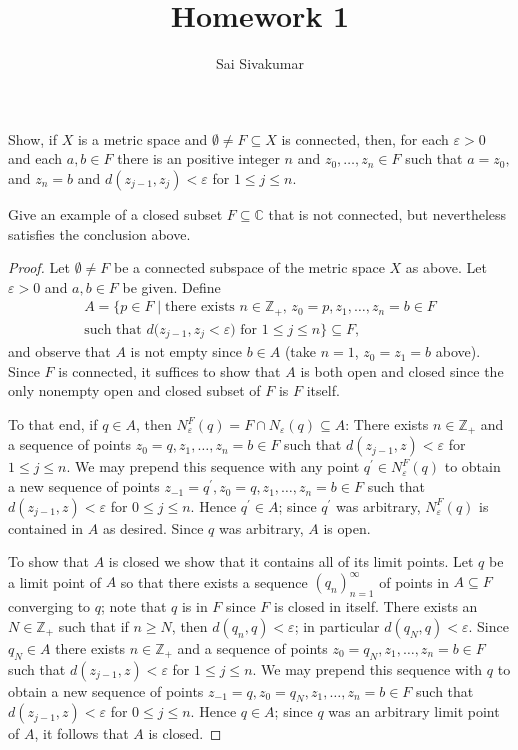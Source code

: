 \documentclass[12pt]{amsart}
\title{Homework 1}
\author{Sai Sivakumar}
\newcommand{\CC}{\mathbb{C}}
\begin{document}
\maketitle

\thispagestyle{empty}

Show, if $X$ is a metric space and $\emptyset \ne F \subseteq X$ is connected,
 then, for each $\varepsilon>0$ and each $a,b\in F$ there is an positive
 integer $n$ and $z_0,\dots,z_n\in F$ such that $a=z_0,$ and $z_n=b$ and
 $d(z_{j-1},z_j)<\varepsilon$ for $1\le j \le n.$ 

 Give an example of a closed subset $F\subseteq \CC$ that is not connected,
 but nevertheless satisfies the conclusion above.

\bigskip
\baselineskip=24pt
\begin{proof}
Let $\emptyset \neq F$ be a connected subspace of the metric space $X$ as above. Let $\varepsilon > 0$ and $a,b\in F$ be given. Define \begin{multline*}
    A = \{p\in F\mid \text{there exists $n\in \mathbb{Z}_+$, $z_0 = p, z_1,\dots,z_n = b\in F$}\\ \text{such that $d(z_{j-1},z_j<\varepsilon$) for $1\leq j\leq n$}\}\subseteq F,
\end{multline*} and observe that $A$ is not empty since $b\in A$ (take $n = 1$, $z_0 = z_1 = b$ above). Since $F$ is connected, it suffices to show that $A$ is both open and closed since the only nonempty open and closed subset of $F$ is $F$ itself.

To that end, if $q\in A$, then $N^F_\varepsilon(q) = F\cap N_\varepsilon(q)\subseteq A$: There exists $n\in \mathbb{Z}_+$ and a sequence of points $z_0 = q, z_1,\dots,z_n = b\in F$ such that $d(z_{j-1},z)<\varepsilon$ for $1\leq j \leq n$. We may prepend this sequence with any point $q^\prime\in N^F_\varepsilon(q)$ to obtain a new sequence of points $z_{-1} = q^\prime, z_0 = q, z_1,\dots,z_n = b\in F$ such that $d(z_{j-1},z)<\varepsilon$ for $0\leq j \leq n$. Hence $q^\prime\in A$; since $q^\prime$ was arbitrary, $N^F_\varepsilon(q)$ is contained in $A$ as desired. Since $q$ was arbitrary, $A$ is open.

To show that $A$ is closed we show that it contains all of its limit points. Let $q$ be a limit point of $A$ so that there exists a sequence $(q_n)_{n=1}^\infty$ of points in $A\subseteq F$ converging to $q$; note that $q$ is in $F$ since $F$ is closed in itself. There exists an $N\in \mathbb{Z}_+$ such that if $n\geq N$, then $d(q_n,q) < \varepsilon$; in particular $d(q_N,q) < \varepsilon$. Since $q_N\in A$ there exists $n\in \mathbb{Z}_+$ and a sequence of points $z_0 = q_N, z_1,\dots,z_n = b\in F$ such that $d(z_{j-1},z)<\varepsilon$ for $1\leq j \leq n$. We may prepend this sequence with $q$ to obtain a new sequence of points $z_{-1} = q, z_0 = q_N, z_1,\dots,z_n = b\in F$ such that $d(z_{j-1},z)<\varepsilon$ for $0\leq j \leq n$. Hence $q\in A$; since $q$ was an arbitrary limit point of $A$, it follows that $A$ is closed.


\end{proof}
\end{document}
